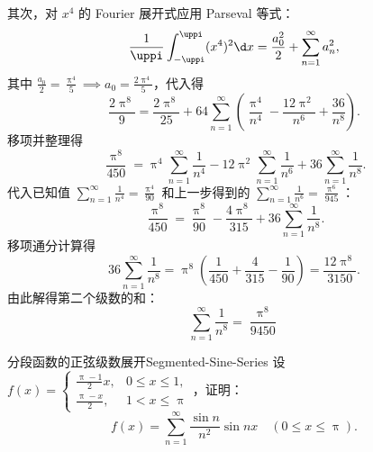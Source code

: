 \begin{solution}
    其次，对 $x^4$ 的 Fourier 展开式应用 Parseval 等式：
    \begin{equation}\label{eq:parseval-x4}
        \frac{1}{\uppi} \int_{-\uppi}^{\uppi} (x^4)^2 \d x = \frac{a_0^2}{2} + \sum_{n=1}^{\infty} a_n^2,
    \end{equation}
    其中 $\frac{a_0}{2} = \frac{\uppi^4}{5} \implies a_0 = \frac{2\uppi^4}{5}$，代入得
    \begin{equation}\label{eq:parseval-x4-calc}
        \frac{2\uppi^8}{9} = \frac{2\uppi^8}{25} + 64 \sum_{n=1}^{\infty} \left( \frac{\uppi^4}{n^4} - \frac{12\uppi^2}{n^6} + \frac{36}{n^8} \right).
    \end{equation}
    移项并整理得
    \begin{equation}\label{eq:parseval-x4-subs}
        \frac{\uppi^8}{450} = \uppi^4 \sum_{n=1}^{\infty} \frac{1}{n^4} - 12\uppi^2 \sum_{n=1}^{\infty} \frac{1}{n^6} + 36 \sum_{n=1}^{\infty} \frac{1}{n^8}.
    \end{equation}
    代入已知值 $\sum_{n=1}^{\infty} \frac{1}{n^4} = \frac{\uppi^4}{90}$ 和上一步得到的 $\sum_{n=1}^{\infty} \frac{1}{n^6} = \frac{\uppi^6}{945}$：
    \begin{equation}\label{eq:parseval-x4-final}
        \frac{\uppi^8}{450} = \frac{\uppi^8}{90} - \frac{4\uppi^8}{315} + 36 \sum_{n=1}^{\infty} \frac{1}{n^8}.
    \end{equation}
    移项通分计算得
    \begin{equation}\label{eq:final-sum-8}
        36 \sum_{n=1}^{\infty} \frac{1}{n^8} = \uppi^8 \left( \frac{1}{450} + \frac{4}{315} - \frac{1}{90} \right) = \frac{12\uppi^8}{3150}.
    \end{equation}
    由此解得第二个级数的和：
    \begin{equation}
        \boxed{\sum_{n=1}^{\infty} \frac{1}{n^8} = \frac{\uppi^8}{9450}}
    \end{equation}
\end{solution}

\begin{problem}{分段函数的正弦级数展开}{Segmented-Sine-Series}
    设 $f(x) = \begin{cases} \frac{\uppi-1}{2}x, & 0 \leqslant x \leqslant 1, \\ \frac{\uppi-x}{2}, & 1 < x \leqslant \uppi \end{cases}$，证明：
    \begin{equation*}
        f(x) = \sum_{n=1}^{\infty} \frac{\sin n}{n^2} \sin nx \quad (0 \leqslant x \leqslant \uppi).
    \end{equation*}
\end{problem}

